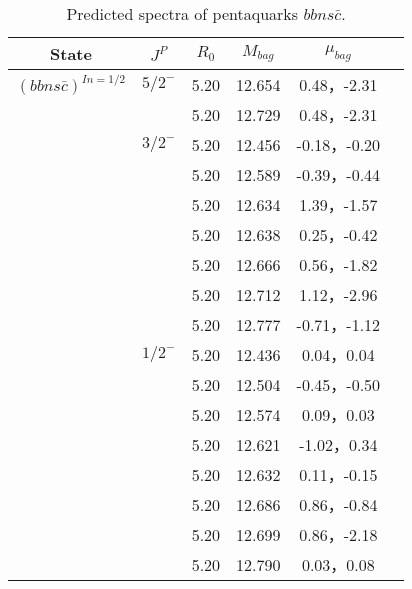 \documentclass[prd,twocolumn,floatfix,nofootinbib]{revtex4}
\begin{document}
\begin{table*}[!htbp]
    \caption{Predicted spectra of pentaquarks $bbns\bar{c}$.}
    \begin{tabular}{cccccc}
        \hline\hline
        {\rm State} &$J^{P}$ &$R_{0}$ &$M_{bag}$ &$\mu_{bag}$ \\ \hline
       ${(bbns\bar{c})}^{I{n}=1/2}$
            &${5/2}^{-}$     &5.20   &12.654 &0.48，-2.31  \\
                         &$ $     &5.20   &12.729 &0.48，-2.31  \\
            &${3/2}^{-}$     &5.20   &12.456 &-0.18，-0.20 \\
                         &$ $     &5.20   &12.589 &-0.39，-0.44  \\
                         &$ $     &5.20   &12.634 &1.39，-1.57  \\
                         &$ $     &5.20   &12.638 &0.25，-0.42 \\
                         &$ $     &5.20   &12.666 &0.56，-1.82  \\
                         &$ $     &5.20   &12.712 &1.12，-2.96  \\
                         &$ $     &5.20   &12.777 &-0.71，-1.12  \\
            &${1/2}^{-}$     &5.20   &12.436 &0.04，0.04  \\
                         &$ $     &5.20   &12.504 &-0.45，-0.50  \\
                         &$ $     &5.20   &12.574 &0.09，0.03  \\
                         &$ $     &5.20   &12.621 &-1.02，0.34 \\
                         &$ $     &5.20   &12.632 &0.11，-0.15 \\
                         &$ $     &5.20   &12.686 &0.86，-0.84  \\
                         &$ $     &5.20   &12.699 &0.86，-2.18 \\
                         &$ $     &5.20   &12.790 &0.03，0.08  \\
        \hline\hline
    \end{tabular}
\end{table*}
\end{document}
